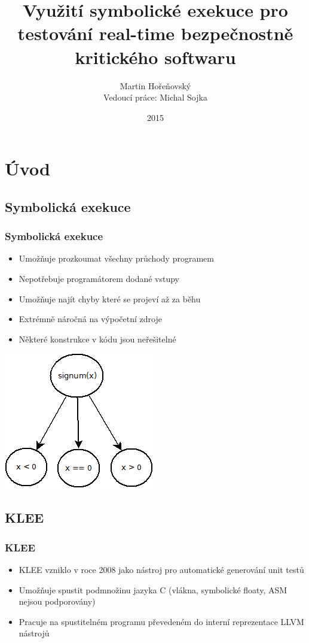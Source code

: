 \documentclass{beamer}
\author[Martin Hořeňovský]{Martin Hořeňovský\\{\small Vedoucí práce: Michal Sojka}}
\title{Využití symbolické exekuce pro testování real-time bezpečnostně
kritického softwaru}
\institute{FEL ČVUT}
\date{2015}
\begin{document}
\begin{frame}
\titlepage
\end{frame}


\section{Úvod}
\subsection*{Symbolická exekuce}
\begin{frame}
\frametitle{Symbolická exekuce}
\begin{itemize}
    \item Umožňuje prozkoumat všechny průchody programem
    \item Nepotřebuje programátorem dodané vstupy
    \item Umožňuje najít chyby které se projeví až za běhu
    \item Extrémně náročná na výpočetní zdroje
    \item Některé konstrukce v kódu jsou neřešitelné
\end{itemize}
\begin{center}
\includegraphics[scale=0.5]{symb-exec.png}
\end{center}
\end{frame}

\subsection*{KLEE}
\begin{frame}
\frametitle{KLEE}
\begin{itemize}
    \item KLEE vzniklo v roce 2008 jako nástroj pro automatické generování
    unit testů
    \item Umožňuje spustit podmnožinu jazyka C (vlákna, symbolické floaty, ASM nejsou podporovány)
    \item Pracuje na spustitelném programu převedeném do interní reprezentace LLVM nástrojů
\end{itemize}
\end{frame}
\end{document}
